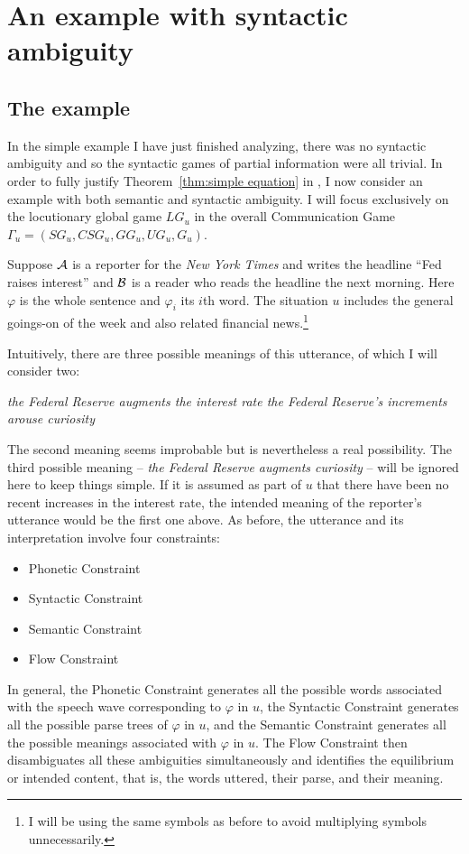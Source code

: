 \chapter{An example with syntactic ambiguity} \label{ch:syntactic ambiguity}

\section{The example}

In the simple example I have just finished analyzing, there was no syntactic ambiguity and so the syntactic games of partial information were all trivial. In order to fully justify Theorem~\ref{thm:simple equation} in , I now consider an example with both semantic and syntactic ambiguity. I will focus exclusively on the locutionary global game $LG_u$ in the overall Communication Game $\Gamma_u = (SG_u, CSG_u, GG_u, UG_u, G_u)$. 


Suppose $\cal A$ is a reporter for the \emph{New York Times} and writes the headline ``Fed raises interest'' and $\cal B$ is a reader who reads the headline the next morning. Here $\varphi$ is the whole sentence and $\varphi_i$ its $i$th word. The situation $u$ includes the general goings-on of the week and also related financial news.\footnote{I will be using the same symbols as before to avoid multiplying symbols unnecessarily.}

Intuitively, there are three possible meanings of this utterance, of which I will consider two:

\ea \itshape the Federal Reserve augments the interest rate \z
\ea \itshape the Federal Reserve's increments arouse curiosity \z

\noindent The second meaning seems improbable but is nevertheless a real possibility. The third possible meaning -- \emph{the Federal Reserve augments curiosity} -- will be ignored here to keep things simple. If it is assumed as part of $u$ that there have been no recent increases in the interest rate, the intended meaning of the reporter's utterance would be the first one above. As before, the utterance and its interpretation involve four constraints:
\begin{itemize}
\item Phonetic Constraint
\item Syntactic Constraint
\item Semantic Constraint
\item Flow Constraint
\end{itemize}
In general, the Phonetic Constraint generates all the possible words associated with the speech wave corresponding to $\varphi$ in $u$, the Syntactic Constraint generates all the possible parse trees of $\varphi$ in $u$, and the Semantic Constraint generates all the possible meanings associated with $\varphi$ in $u$. The Flow Constraint then disambiguates all these ambiguities simultaneously and identifies the equilibrium or intended content, that is, the words uttered, their parse, and their meaning.

